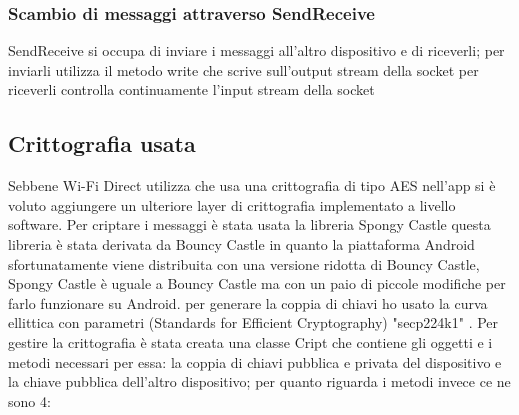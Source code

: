 \subsubsection{Scambio di messaggi attraverso SendReceive}

SendReceive si occupa di inviare i messaggi all'altro dispositivo
e di riceverli;
per inviarli utilizza il metodo write che scrive
sull'output stream della socket
per riceverli controlla continuamente l'input stream
della socket


\subsection{Crittografia usata}

Sebbene Wi-Fi Direct utilizza  che usa una crittografia di tipo
AES \cite{Wi-FiProtected}
nell'app si è voluto aggiungere un ulteriore layer di crittografia
implementato a livello software.
Per criptare i messaggi è stata usata la libreria
Spongy Castle \cite{Spongy} questa libreria è stata derivata
da Bouncy Castle in quanto 
la piattaforma Android sfortunatamente viene
distribuita con una versione ridotta di Bouncy Castle,
Spongy Castle è uguale a Bouncy Castle
ma con un paio di piccole modifiche per farlo funzionare su Android.
per generare la coppia di chiavi ho usato la curva ellittica con parametri
(Standards for Efficient Cryptography)
"secp224k1" \cite{sec}.
Per gestire la crittografia è stata creata una classe Cript che contiene
gli oggetti e i metodi necessari per essa: la coppia di chiavi pubblica e privata
del dispositivo e la chiave pubblica dell'altro dispositivo; per quanto riguarda i metodi
invece ce ne sono 4:
